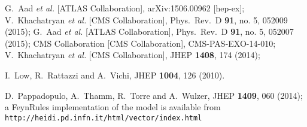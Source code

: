   G.~Aad {\it et al.} [ATLAS Collaboration],
  arXiv:1506.00962 [hep-ex]; 
  V.~Khachatryan {\it et al.} [CMS Collaboration],
  Phys.\ Rev.\ D {\bf 91}, no. 5, 052009 (2015);
  G.~Aad {\it et al.} [ATLAS Collaboration],
  Phys.\ Rev.\ D {\bf 91}, no. 5, 052007 (2015);
  CMS Collaboration [CMS Collaboration],
  CMS-PAS-EXO-14-010;
  V.~Khachatryan {\it et al.} [CMS Collaboration],
  JHEP {\bf 1408}, 174 (2014);

  I.~Low, R.~Rattazzi and A.~Vichi,
  JHEP {\bf 1004}, 126 (2010).

  D.~Pappadopulo, A.~Thamm, R.~Torre and A.~Wulzer,
  JHEP {\bf 1409}, 060 (2014); a FeynRules implementation
  of the model is available from 
  \texttt{http://heidi.pd.infn.it/html/vector/index.html}

